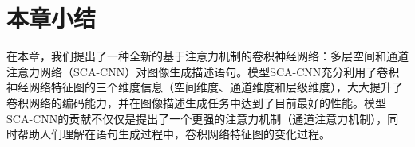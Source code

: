 \section{本章小结}

在本章，我们提出了一种全新的基于注意力机制的卷积神经网络：多层空间和通道注意力网络（SCA-CNN）对图像生成描述语句。模型SCA-CNN充分利用了卷积神经网络特征图的三个维度信息（空间维度、通道维度和层级维度），大大提升了卷积网络的编码能力，并在图像描述生成任务中达到了目前最好的性能。模型SCA-CNN的贡献不仅仅是提出了一个更强的注意力机制（通道注意力机制），同时帮助人们理解在语句生成过程中，卷积网络特征图的变化过程。